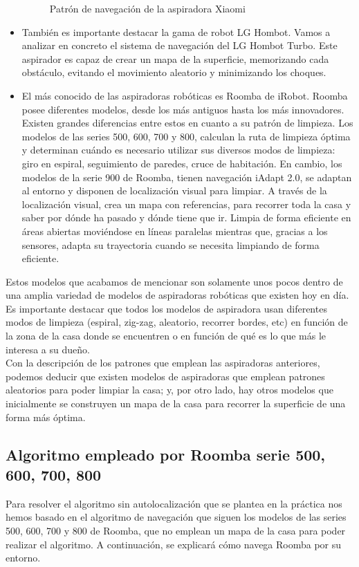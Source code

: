 \begin{itemize}
\begin{figure}[H]
\begin{center}
		\caption{Patrón de navegación de la aspiradora Xiaomi}
		\label{fig.Xiaomi}
		\end{center}
\end{figure}
\item También es importante destacar la gama de robot LG Hombot. Vamos a analizar en concreto el sistema de navegación del LG Hombot Turbo. Este aspirador es capaz de crear un mapa de la superficie, memorizando cada obstáculo, evitando el movimiento aleatorio y minimizando los choques.
\item El más conocido de las aspiradoras robóticas es Roomba de iRobot. Roomba posee diferentes modelos, desde los más antiguos hasta los más innovadores. Existen grandes diferencias entre estos en cuanto a su patrón de limpieza. Los modelos de las series 500, 600, 700 y 800, calculan la ruta de limpieza óptima y determinan cuándo es necesario utilizar sus diversos modos de limpieza: giro en espiral, seguimiento de paredes, cruce de habitación. En cambio, los modelos de la serie 900 de Roomba, tienen navegación iAdapt 2.0, se adaptan al entorno y disponen de localización visual para limpiar. A través de la localización visual, crea un mapa con referencias, para recorrer toda la casa y saber por dónde ha pasado y dónde tiene que ir. Limpia de forma eficiente en áreas abiertas moviéndose en líneas paralelas mientras que, gracias a los sensores, adapta su trayectoria cuando se necesita limpiando de forma eficiente.
\end{itemize}

Estos modelos que acabamos de mencionar son solamente unos pocos dentro de una amplia variedad de modelos de aspiradoras robóticas que existen hoy en día.\\

Es importante destacar que todos los modelos de aspiradora usan diferentes modos de limpieza (espiral, zig-zag, aleatorio, recorrer bordes, etc) en función de la zona de la casa donde se encuentren o en función de qué es lo que más le interesa a su dueño.\\

Con la descripción de los patrones que emplean las aspiradoras anteriores, podemos deducir que existen modelos de aspiradoras que emplean patrones aleatorios para poder limpiar la casa; y, por otro lado, hay otros modelos que inicialmente se construyen un mapa de la casa para recorrer la superficie de una forma más óptima.\\

\subsection{Algoritmo empleado por Roomba serie 500, 600, 700, 800}
Para resolver el algoritmo sin autolocalización que se plantea en la práctica nos hemos basado en el algoritmo de navegación que siguen los modelos de las series 500, 600, 700 y 800 de Roomba, que no emplean un mapa de la casa para poder realizar el algoritmo. A continuación, se explicará cómo navega Roomba por su entorno.\\

